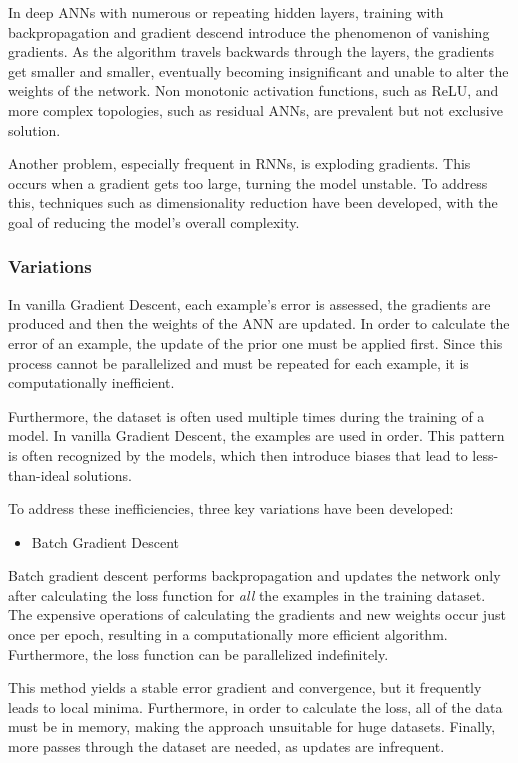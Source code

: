 In deep ANNs with numerous or repeating hidden layers, training with backpropagation and gradient descend introduce the phenomenon of vanishing gradients. As the algorithm travels backwards through the layers, the gradients get smaller and smaller, eventually becoming insignificant and unable to alter the weights of the network. Non monotonic activation functions, such as ReLU, and more complex topologies, such as residual ANNs, are prevalent but not exclusive solution.

Another problem, especially frequent in RNNs, is exploding gradients. This occurs when a gradient gets too large, turning the model unstable. To address this, techniques such as dimensionality reduction have been developed, with the goal of reducing the model's overall complexity.

\subsubsection{Variations}
In vanilla Gradient Descent, each example's error is assessed, the gradients are produced and then the weights of the ANN are updated. In order to calculate the error of an example, the update of the prior one must be applied first. Since this process cannot be parallelized and must be repeated for each example, it is computationally inefficient.

Furthermore, the dataset is often used multiple times during the training of a model. In vanilla Gradient Descent, the examples are used in order. This pattern is often recognized by the models, which then introduce biases that lead to less-than-ideal solutions.

To address these inefficiencies, three key variations have been developed:

\begin{itemize}
    \item Batch Gradient Descent
\end{itemize}
Batch gradient descent performs backpropagation and updates the network only after calculating the loss function for \textit{all} the examples in the training dataset. The expensive operations of calculating the gradients and new weights occur just once per epoch, resulting in a computationally more efficient algorithm. Furthermore, the loss function can be parallelized indefinitely.

This method yields a stable error gradient and convergence, but it frequently leads to local minima. Furthermore, in order to calculate the loss, all of the data must be in memory, making the approach unsuitable for huge datasets. Finally, more passes through the dataset are needed, as updates are infrequent.

